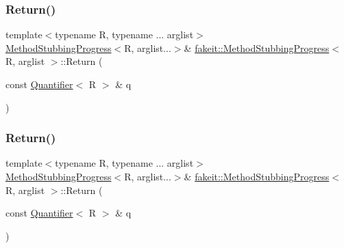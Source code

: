 \mbox{\label{structfakeit_1_1MethodStubbingProgress_acb4d4db8208a8eaadff77e7cbf3775db}} 
\subsubsection{\texorpdfstring{Return()}{Return()}\hspace{0.1cm}{\footnotesize\ttfamily [14/45]}}
{\footnotesize\ttfamily template$<$typename R, typename ... arglist$>$ \\
\mbox{\hyperlink{structfakeit_1_1MethodStubbingProgress}{Method\+Stubbing\+Progress}}$<$R, arglist...$>$\& \mbox{\hyperlink{structfakeit_1_1MethodStubbingProgress}{fakeit\+::\+Method\+Stubbing\+Progress}}$<$ R, arglist $>$\+::Return (\begin{DoxyParamCaption}\item[{const \mbox{\hyperlink{structfakeit_1_1Quantifier}{Quantifier}}$<$ R $>$ \&}]{q }\end{DoxyParamCaption})\hspace{0.3cm}{\ttfamily [inline]}}

\mbox{\label{structfakeit_1_1MethodStubbingProgress_acb4d4db8208a8eaadff77e7cbf3775db}} 
\subsubsection{\texorpdfstring{Return()}{Return()}\hspace{0.1cm}{\footnotesize\ttfamily [15/45]}}
{\footnotesize\ttfamily template$<$typename R, typename ... arglist$>$ \\
\mbox{\hyperlink{structfakeit_1_1MethodStubbingProgress}{Method\+Stubbing\+Progress}}$<$R, arglist...$>$\& \mbox{\hyperlink{structfakeit_1_1MethodStubbingProgress}{fakeit\+::\+Method\+Stubbing\+Progress}}$<$ R, arglist $>$\+::Return (\begin{DoxyParamCaption}\item[{const \mbox{\hyperlink{structfakeit_1_1Quantifier}{Quantifier}}$<$ R $>$ \&}]{q }\end{DoxyParamCaption})\hspace{0.3cm}{\ttfamily [inline]}}

